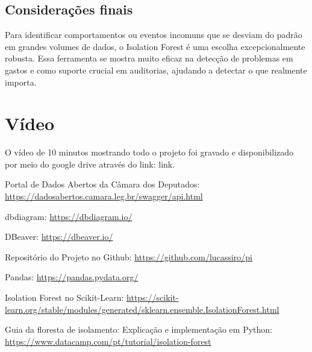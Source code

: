 \documentclass[12pt, a4paper]{article}
\begin{document}
\subsection{Considerações finais}

Para identificar comportamentos ou eventos incomuns que se desviam do padrão em grandes volumes de dados, o Isolation Forest é uma escolha excepcionalmente robusta. Essa ferramenta se mostra muito eficaz na detecção de problemas em gastos e como suporte crucial em auditorias, ajudando a detectar o que realmente importa.

\section{Vídeo}
O vídeo de 10 minutos mostrando todo o projeto foi gravado e disponibilizado por meio do google drive através do link: link.

\begin{thebibliography}{9}
     Portal de Dados Abertos da Câmara dos Deputados: 
    \href{https://dadosabertos.camara.leg.br/swagger/api.html}{https://dadosabertos.camara.leg.br/swagger/api.html}

     dbdiagram: 
    \href{https://dbdiagram.io/}{https://dbdiagram.io/}
    
     DBeaver: 
    \href{https://dbeaver.io/}{https://dbeaver.io/}

     Repositório do Projeto no Github: 
    \href{https://github.com/lucassiro/pi}{https://github.com/lucassiro/pi}
    
     Pandas: 
    \href{https://pandas.pydata.org/}{https://pandas.pydata.org/}
    
     Isolation Forest no Scikit-Learn: 
    \href{https://scikit-learn.org/stable/modules/generated/sklearn.ensemble.IsolationForest.html}{https://scikit-learn.org/stable/modules/generated/sklearn.ensemble.IsolationForest.html}
    
     Guia da floresta de isolamento: Explicação e implementação em Python: 
    \href{https://www.datacamp.com/pt/tutorial/isolation-forest}{https://www.datacamp.com/pt/tutorial/isolation-forest}
\end{thebibliography}
\end{document}
